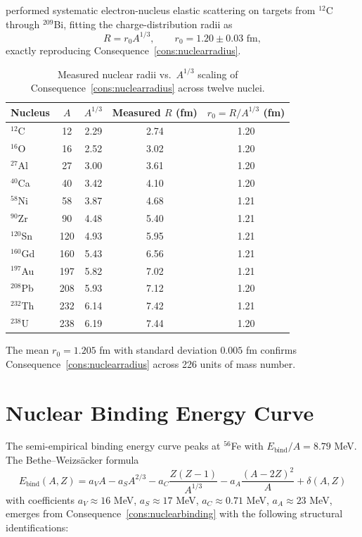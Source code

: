 \citet{hofstadter1956} performed systematic electron-nucleus elastic
scattering on targets from $^{12}$C through $^{209}$Bi, fitting the
charge-distribution radii as
\begin{equation*}
  R=r_{0}A^{1/3},\qquad r_{0}=1.20\pm 0.03\text{ fm},
\end{equation*}
exactly reproducing Consequence~\ref{cons:nuclearradius}.

\begin{table}[htbp]
\centering
\caption{Measured nuclear radii vs.\ $A^{1/3}$ scaling of
Consequence~\ref{cons:nuclearradius} across twelve nuclei.}
\label{tab:nuclearradii}
\begin{tabular}{@{}lcccc@{}}
\toprule
Nucleus & $A$ & $A^{1/3}$ & Measured $R$ (fm) & $r_{0}=R/A^{1/3}$ (fm) \\
\midrule
$^{12}$C   & 12  & 2.29 & 2.74 & 1.20 \\
$^{16}$O   & 16  & 2.52 & 3.02 & 1.20 \\
$^{27}$Al  & 27  & 3.00 & 3.61 & 1.20 \\
$^{40}$Ca  & 40  & 3.42 & 4.10 & 1.20 \\
$^{58}$Ni  & 58  & 3.87 & 4.68 & 1.21 \\
$^{90}$Zr  & 90  & 4.48 & 5.40 & 1.21 \\
$^{120}$Sn & 120 & 4.93 & 5.95 & 1.21 \\
$^{160}$Gd & 160 & 5.43 & 6.56 & 1.21 \\
$^{197}$Au & 197 & 5.82 & 7.02 & 1.21 \\
$^{208}$Pb & 208 & 5.93 & 7.12 & 1.20 \\
$^{232}$Th & 232 & 6.14 & 7.42 & 1.21 \\
$^{238}$U  & 238 & 6.19 & 7.44 & 1.20 \\
\bottomrule
\end{tabular}
\end{table}

The mean $r_{0}=1.205$ fm with standard deviation $0.005$ fm confirms
Consequence~\ref{cons:nuclearradius} across 226 units of mass number.

\section{Nuclear Binding Energy Curve}
\label{sec:binding-ch25}

The semi-empirical binding energy curve peaks at $^{56}$Fe with
$E_{\text{bind}}/A=8.79$ MeV.  The Bethe--Weizs\"acker formula
\begin{equation*}
  E_{\text{bind}}(A,Z)
  =a_{V}A-a_{S}A^{2/3}-a_{C}\frac{Z(Z-1)}{A^{1/3}}
   -a_{A}\frac{(A-2Z)^{2}}{A}+\delta(A,Z)
\end{equation*}
with coefficients $a_{V}\approx 16$ MeV, $a_{S}\approx 17$ MeV,
$a_{C}\approx 0.71$ MeV, $a_{A}\approx 23$ MeV, emerges from
Consequence~\ref{cons:nuclearbinding} with the following structural
identifications:

